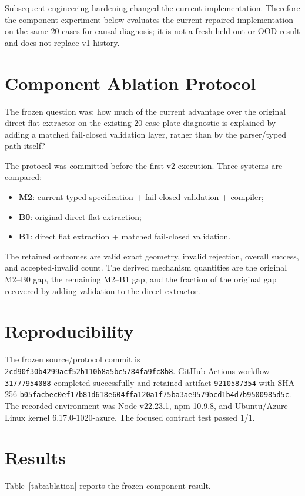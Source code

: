 \documentclass[10pt]{article}
\begin{document}
Subsequent engineering hardening changed the current implementation. Therefore the component experiment below evaluates the current repaired implementation on the same 20 cases for causal diagnosis; it is not a fresh held-out or OOD result and does not replace v1 history.

\section{Component Ablation Protocol}
The frozen question was: how much of the current advantage over the original direct flat extractor on the existing 20-case plate diagnostic is explained by adding a matched fail-closed validation layer, rather than by the parser/typed path itself?

The protocol was committed before the first v2 execution. Three systems are compared:

\begin{itemize}
\item \textbf{M2}: current typed specification + fail-closed validation + compiler;
\item \textbf{B0}: original direct flat extraction;
\item \textbf{B1}: direct flat extraction + matched fail-closed validation.
\end{itemize}

The retained outcomes are valid exact geometry, invalid rejection, overall success, and accepted-invalid count. The derived mechanism quantities are the original M2--B0 gap, the remaining M2--B1 gap, and the fraction of the original gap recovered by adding validation to the direct extractor.

\section{Reproducibility}
The frozen source/protocol commit is \texttt{2cd90f30b4299acf52b110b8a5bc5784fa9fc8b8}. GitHub Actions workflow \texttt{31777954088} completed successfully and retained artifact \texttt{9210587354} with SHA-256 \texttt{b05facbec0ef17b81d618e604ffa120a1f75ba3ae9579bcd1b4d7b9500985d5c}. The recorded environment was Node v22.23.1, npm 10.9.8, and Ubuntu/Azure Linux kernel 6.17.0-1020-azure. The focused contract test passed 1/1.

\section{Results}
Table~\ref{tab:ablation} reports the frozen component result.
\end{document}
